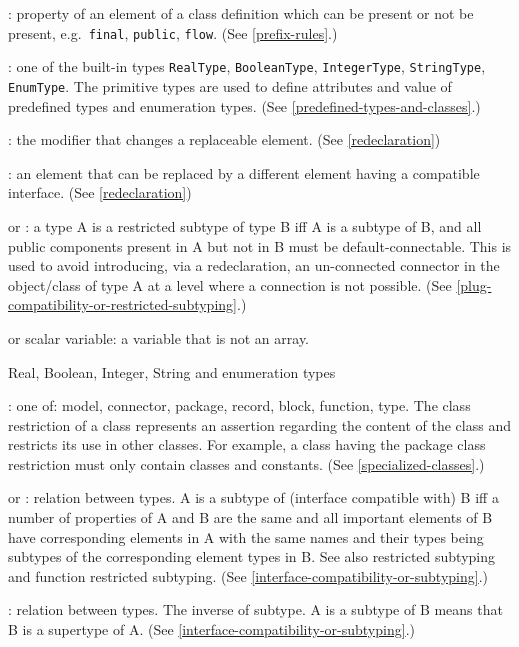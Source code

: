 : property of an element of a class definition which can
be present or not be present, e.g.\ \lstinline!final!, \lstinline!public!, \lstinline!flow!. (See \cref{prefix-rules}.)

: one of the built-in types \lstinline!RealType!,
\lstinline!BooleanType!, \lstinline!IntegerType!, \lstinline!StringType!, \lstinline!EnumType!. The primitive types are
used to define attributes and value of predefined types and enumeration
types. (See \cref{predefined-types-and-classes}.)

: the modifier that changes a replaceable element.
(See \cref{redeclaration})

: an element that can be replaced by a different
element having a compatible interface. (See \cref{redeclaration})

 or : a type A
is a restricted subtype of type B iff A is a subtype of B, and all
public components present in A but not in B must be default-connectable.
This is used to avoid introducing, via a redeclaration, an un-connected
connector in the object/class of type A at a level where a connection is
not possible. (See \cref{plug-compatibility-or-restricted-subtyping}.)

 or scalar variable: a variable that is not an array.

 Real, Boolean, Integer, String and enumeration
types

: one of: model, connector, package, record,
block, function, type. The class restriction of a class represents an
assertion regarding the content of the class and restricts its use in
other classes. For example, a class having the package class restriction
must only contain classes and constants. (See \cref{specialized-classes}.)

 or : relation between
types. A is a subtype of (interface compatible with) B iff a number of
properties of A and B are the same and all important elements of B have
corresponding elements in A with the same names and their types being
subtypes of the corresponding element types in B. See also restricted
subtyping and function restricted subtyping. (See \cref{interface-compatibility-or-subtyping}.)

: relation between types. The inverse of subtype. A is
a subtype of B means that B is a supertype of A. (See \cref{interface-compatibility-or-subtyping}.)

